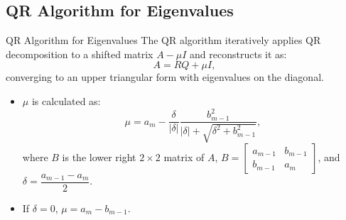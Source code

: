 \documentclass{beamer}
\numberwithin{equation}{section}
\begin{document}
\subsection{QR Algorithm for Eigenvalues}
\begin{frame}{QR Algorithm for Eigenvalues}
The QR algorithm iteratively applies QR decomposition to a shifted matrix \( A - \mu I \) and reconstructs it as:
\[
A = RQ + \mu I,
\]
converging to an upper triangular form with eigenvalues on the diagonal.

\begin{itemize}
    \item \( \mu \) is calculated as:
    \[
    \mu = a_m - \dfrac{\delta}{|\delta|} \dfrac{b_{m-1}^2}{|\delta| + \sqrt{\delta^2 + b_{m-1}^2}},
    \]
    where \( B \) is the lower right \( 2 \times 2 \) matrix of \( A \), \( B = \begin{bmatrix} a_{m-1} & b_{m-1} \\ b_{m-1} & a_m \end{bmatrix} \), and \( \delta = \dfrac{a_{m-1} - a_m}{2} \).
    \item If \( \delta = 0 \), \( \mu = a_m - b_{m-1} \).
\end{itemize}
\end{frame}
\end{document}
